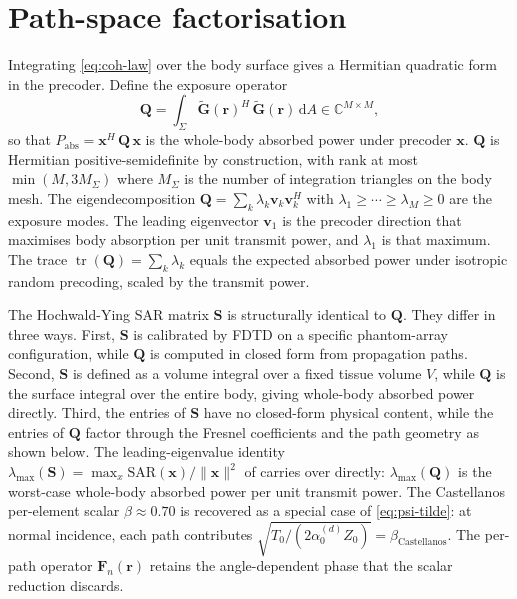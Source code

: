 \documentclass[journal,twocolumn,10pt]{IEEEtran}
\theoremstyle{plain}
\theoremstyle{remark}
\newcommand{\rr}{\mathbf{r}}
\newcommand{\xx}{\mathbf{x}}
\newcommand{\Gtil}{\tilde{\mathbf{G}}}
\newcommand{\Qmat}{\mathbf{Q}}
\newcommand{\Fn}{\mathbf{F}_n}
\newcommand{\diff}{\mathrm{d}}
\newcommand{\Complex}{\mathbb{C}}
\DeclareMathOperator{\tr}{tr}
\begin{document}
\section{Path-space factorisation}\label{sec:path-space}

Integrating \cref{eq:coh-law} over the body surface gives a
Hermitian quadratic form in the precoder. Define the exposure
operator
\begin{equation}\label{eq:Q-def}
  \Qmat = \int_\Sigma \Gtil(\rr)^H\,\Gtil(\rr)\,\diff A
  \in \Complex^{M \times M},
\end{equation}
so that $P_{\mathrm{abs}} = \xx^H\,\Qmat\,\xx$ is the whole-body
absorbed power under precoder $\xx$. $\Qmat$ is Hermitian
positive-semidefinite by construction, with rank at most
$\min(M, 3 M_\Sigma)$ where $M_\Sigma$ is the number of integration
triangles on the body mesh. The eigendecomposition
$\Qmat = \sum_k \lambda_k \mathbf{v}_k \mathbf{v}_k^H$ with
$\lambda_1 \geq \cdots \geq \lambda_M \geq 0$ are the exposure
modes. The leading eigenvector $\mathbf{v}_1$ is the precoder
direction that maximises body absorption per unit transmit power,
and $\lambda_1$ is that maximum. The trace
$\tr(\Qmat) = \sum_k \lambda_k$ equals the expected absorbed power
under isotropic random precoding, scaled by the transmit power.

The Hochwald-Ying SAR matrix $\mathbf{S}$ is structurally identical
to $\Qmat$. They differ in three ways. First, $\mathbf{S}$ is
calibrated by FDTD on a specific phantom-array configuration, while
$\Qmat$ is computed in closed form from propagation paths. Second,
$\mathbf{S}$ is defined as a volume integral over a fixed tissue
volume $V$, while $\Qmat$ is the surface integral over the entire
body, giving whole-body absorbed power directly. Third, the entries
of $\mathbf{S}$ have no closed-form physical content, while the
entries of $\Qmat$ factor through the Fresnel coefficients and the
path geometry as shown below. The leading-eigenvalue identity
$\lambda_{\max}(\mathbf{S}) = \max_x \mathrm{SAR}(\xx) / \|\xx\|^2$
of \cite{Ebadi2019} carries over directly: $\lambda_{\max}(\Qmat)$
is the worst-case whole-body absorbed power per unit transmit
power. The Castellanos per-element scalar $\beta \approx 0.70$
\cite{Castellanos2020} is recovered as a special case of
\cref{eq:psi-tilde}: at normal incidence, each path contributes
$\sqrt{T_0/(2\alpha_0^{(d)} Z_0)} = \beta_{\mathrm{Castellanos}}$.
The per-path operator $\Fn(\rr)$ retains the angle-dependent phase
that the scalar reduction discards.
\end{document}
